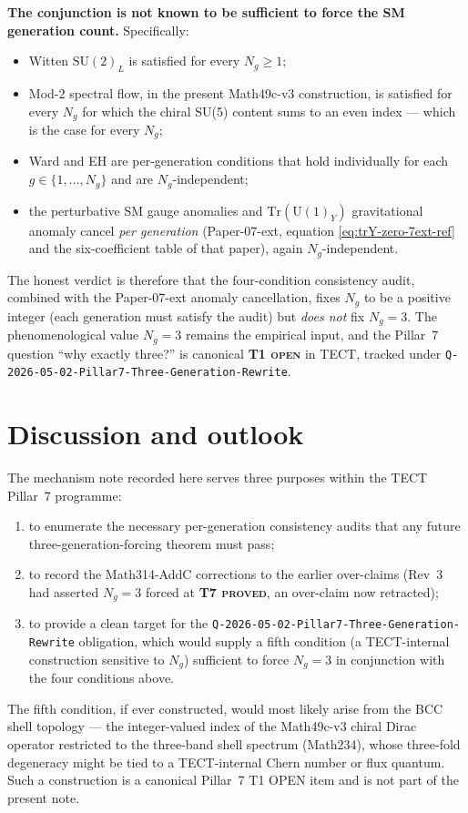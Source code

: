 \textbf{The conjunction is not known to be sufficient to force the SM
generation count.} Specifically:
\begin{itemize}
  \item Witten $\mathrm{SU}(2)_L$ is satisfied for every $N_g\geq 1$;
  \item Mod-$2$ spectral flow, in the present Math49c-v3 construction,
    is satisfied for every $N_g$ for which the chiral SU(5) content
    sums to an even index --- which is the case for every $N_g$;
  \item Ward and EH are per-generation conditions that hold
    individually for each $g\in\{1,\dots,N_g\}$ and are
    $N_g$-independent;
  \item the perturbative SM gauge anomalies and
    $\mathrm{Tr}(\mathrm{U}(1)_Y)$ gravitational anomaly cancel
    \emph{per generation} (Paper-07-ext, equation
    \eqref{eq:trY-zero-7ext-ref} and the six-coefficient table of
    that paper), again $N_g$-independent.
\end{itemize}

The honest verdict is therefore that the four-condition consistency
audit, combined with the Paper-07-ext anomaly cancellation, fixes
$N_g$ to be a positive integer (each generation must satisfy the
audit) but \emph{does not} fix $N_g = 3$. The phenomenological value
$N_g = 3$ remains the empirical input, and the Pillar~7 question
``why exactly three?''  is canonical \textbf{T1 \textsc{open}} in
TECT, tracked under
\texttt{Q-2026-05-02-Pillar7-Three-Generation-Rewrite}.

\section{Discussion and outlook}\label{sec:discussion}
The mechanism note recorded here serves three purposes within the
TECT Pillar~7 programme:
\begin{enumerate}
  \item to enumerate the necessary per-generation consistency audits
    that any future three-generation-forcing theorem must pass;
  \item to record the Math314-AddC corrections to the earlier
    over-claims (Rev~3 had asserted $N_g = 3$ forced at \textbf{T7
    \textsc{proved}}, an over-claim now retracted);
  \item to provide a clean target for the
    \texttt{Q-2026-05-02-Pillar7-Three-Generation-Rewrite} obligation,
    which would supply a fifth condition (a TECT-internal
    construction sensitive to $N_g$) sufficient to force $N_g = 3$
    in conjunction with the four conditions above.
\end{enumerate}
The fifth condition, if ever constructed, would most likely arise
from the BCC shell topology --- the integer-valued index of the
Math49c-v3 chiral Dirac operator restricted to the three-band shell
spectrum (Math234), whose three-fold degeneracy might be tied to a
TECT-internal Chern number or flux quantum. Such a construction is a
canonical Pillar~7 T1 OPEN item and is not part of the present note.


